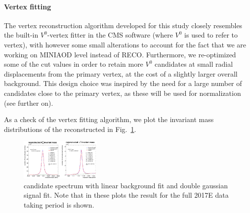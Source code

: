 \paragraph{Vertex fitting}
\label{sec:vertexfitting}
The vertex reconstruction algorithm developed for this study closely
resembles the built-in $V^0$-vertex fitter in the CMS software (where
$V^0$ is used to refer to \PKzS vertex), with however some small
alterations to account for the fact that we are working on MINIAOD
level instead of RECO. Furthermore, we re-optimized some of the cut
values in order to retain more $V^0$ candidates at small radial
displacements from the primary vertex, at the cost of a slightly
larger overall background. This design choice was inspired by the need
for a large number of candidates close to the primary vertex, as these
will be used for normalization (see further on). 

As a check of the vertex fitting algorithm, we plot the invariant mass distributions of the reconstructed \PKzS in Fig.~\ref{fig:invmass_mumuskim}.
\begin{figure}[h]
    \centering
    \includegraphics[clip,trim=0 0 16cm 0,width=0.35\textwidth]{Figures/c6/efficiencies/invmass_mumuskim}
    \caption{\PKzS candidate spectrum with linear background fit and
      double gaussian signal fit. Note that in these plots the result for the full 2017E data taking period is shown. }
    \label{fig:invmass_mumuskim}
\end{figure}


